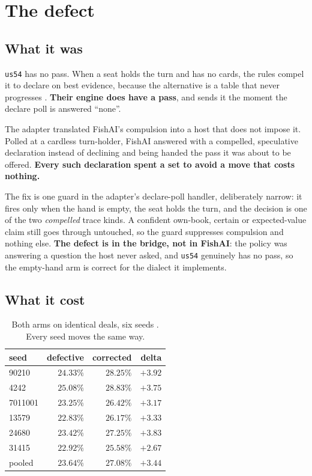 \documentclass[11pt]{article}
\newcommand{\code}[1]{\texttt{#1}}
\newcommand{\usff}{\code{us54}}
\begin{document}
\section{The defect}
\label{sec:defect}

\subsection{What it was}

\usff{} has no pass. When a seat holds the turn and has no cards, the rules compel it to declare on
best evidence, because the alternative is a table that never progresses \cite{rules}. \textbf{Their
engine does have a pass}, and sends it the moment the declare poll is answered ``none''.

The adapter translated FishAI's compulsion into a host that does not impose it. Polled at a cardless
turn-holder, FishAI answered with a compelled, speculative declaration instead of declining and
being handed the pass it was about to be offered. \textbf{Every such declaration spent a set to
avoid a move that costs nothing.}

The fix is one guard in the adapter's declare-poll handler, deliberately narrow: it fires only when
the hand is empty, the seat holds the turn, and the decision is one of the two \emph{compelled}
trace kinds. A confident own-book, certain or expected-value claim still goes through untouched, so
the guard suppresses compulsion and nothing else. \textbf{The defect is in the bridge, not in
FishAI}: the policy was answering a question the host never asked, and \usff{} genuinely has no
pass, so the empty-hand arm is correct for the dialect it implements.

\subsection{What it cost}

\begin{table}[t]
\centering
\caption{Both arms on identical deals, six seeds \cite{crossplay}. Every seed moves the same way.}
\label{tab:defect}
\footnotesize
\begin{tabular}{@{}lrrr@{}}
\toprule
seed & defective & corrected & delta \\
\midrule
90210   & $24.33\%$ & $28.25\%$ & $+3.92$ \\
4242    & $25.08\%$ & $28.83\%$ & $+3.75$ \\
7011001 & $23.25\%$ & $26.42\%$ & $+3.17$ \\
13579   & $22.83\%$ & $26.17\%$ & $+3.33$ \\
24680   & $23.42\%$ & $27.25\%$ & $+3.83$ \\
31415   & $22.92\%$ & $25.58\%$ & $+2.67$ \\
\midrule
pooled  & $23.64\%$ & $\mathbf{27.08\%}$ & $\mathbf{+3.44}$ \\
\bottomrule
\end{tabular}
\end{table}
\end{document}
